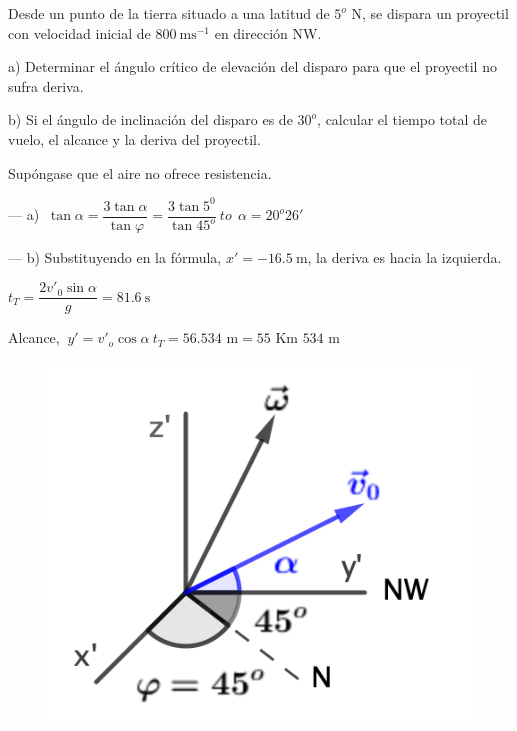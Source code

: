 \begin{prob}
Desde un punto de la tierra situado a una latitud de $5^o$ N, se dispara un proyectil con velocidad inicial de $800\ \mathrm{m s}^{-1}$ en dirección NW.
\vspace{-3mm} %
\begin{changemargin}{5mm}{5mm} 
	a) Determinar el ángulo crítico de elevación del disparo para que el proyectil no sufra deriva.

	b) Si el ángulo de inclinación del disparo es de $30^o$, calcular el tiempo total de vuelo, el alcance y la deriva del proyectil.
\end{changemargin} 

Supóngase que el aire no ofrece resistencia.	
\end{prob}
\begin{multicols}{2}
--- a) $\ \tan \alpha=\dfrac{3 \tan \alpha}{\tan \varphi}=\dfrac{3 \tan 5^0}{\tan 45^o} \ to \ \ \alpha=20^o 26'$

--- b) Substituyendo en la fórmula, $x'=-16.5\ \text{m}$, la deriva es hacia la izquierda.

$t_T=\dfrac{2v'_0 \sin \alpha}{g}=81.6\ \text{s}$

Alcance, $\ y'=v'_o \cos \alpha \ t_T = 56.534 \text{ m}=55 \text{ Km } 534 \text{ m}$
\begin{figure}[H]
	\centering
	\includegraphics[width=.4\textwidth]{imagenes/imagenes10/T10IM17.png}
\end{figure}
\end{multicols}



\newpage %

